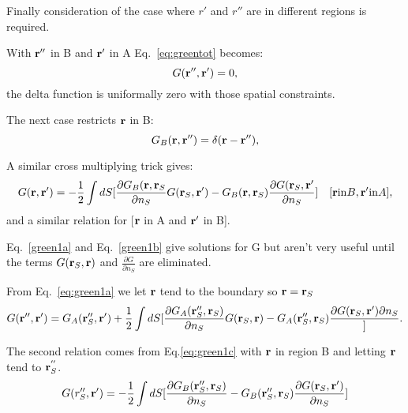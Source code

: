 \documentclass{article}
\def\r{{\bf r}}
\begin{document}
Finally consideration of the case where $r'$ and $r''$ are in different regions is required.

With $\r''$ in B and $\r'$ in A Eq.~\ref{eq:greentot} becomes:
%
\begin{equation}
[-\frac{1}{2}\nabla^{2}_{\r''} + V(\r'') - E]G(\r'',\r') = 0,
\end{equation}
%
the delta function is uniformally zero with those spatial constraints.

The next case restricts $\r$ in B:
%
\begin{equation}
[-\frac{1}{2}\nabla^{2}_{\r''} + V(\r'') - E]G_B(\r,\r'')= \delta(\r-\r''),
\end{equation}
%

A similar cross multiplying trick gives:
%
\begin{equation}
\label{eq:green1c}
G(\r,\r') = -\frac{1}{2} \int dS[\frac{\partial G_{B}(\r, \r_{S}}{\partial n_{S}} G(\r_{S},\r')
- G_{B}(\r, \r_{S})\frac{\partial G(\r_{S},\r'}{\partial n_{S}}] \quad [\r {\rm in} B, \r' {\rm in} A],
\end{equation}
%
and a similar relation for [$\r$ in A and $\r'$ in B].

Eq.~\ref{green1a} and Eq.~\ref{green1b} give solutions for G but 
aren't very useful until the terms $G(\r_S,\r)$ and 
$\frac{\partial G}{\partial n_{S}}$ are eliminated.

From Eq.~\ref{eq:green1a} we let $\r$ tend to the boundary so $\r = \r_{S}$
%
\begin{equation}
\label{eq:greensys1}
G(\r'',\r') = G_{A}(\r''_{S}, \r') + \frac{1}{2} \int d{S}
[\frac{\partial G_{A}(\r''_{S}, \r_{S})}{\partial n_{S}} G(\r_{S},\r) - 
G_{A}(\r''_{S},\r_{S})\frac{\partial{G(\r_{S}, \r')}{\partial n_{S}}}].
\end{equation}
%

The second relation comes from Eq.\ref{eq:green1c} with 
$\r$ in region B and letting $\r$ tend to $\r^{''}_{S}$.
%
\begin{equation}
\label{eq:greensys2}
G(r''_{S}, \r') = -\frac{1}{2}\int dS [\frac{\partial G_{B}(\r''_{S}, \r_{S})}{\partial n_{S}}
-G_{B}(\r''_{S},\r_{S})\frac{\partial G(\r_{S},\r')}{\partial n_{S}}]
\end{equation}
%
\end{document}
